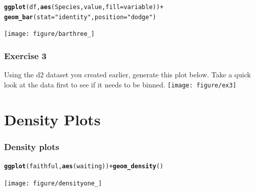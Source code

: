 \documentclass{beamer}\usepackage{graphicx, color}
\makeatletter
\newcommand{\hlfunctioncall}[1]{\textcolor[rgb]{0.501960784313725,0,0.329411764705882}{\textbf{#1}}}%
\newcommand{\hlstring}[1]{\textcolor[rgb]{0.6,0.6,1}{#1}}%
\newenvironment{kframe}{%
 \def\at@end@of@kframe{}%
 \ifinner\ifhmode%
  \def\at@end@of@kframe{\end{minipage}}%
  \begin{minipage}{\columnwidth}%
 \fi\fi%
 \def\FrameCommand##1{\hskip\@totalleftmargin \hskip-\fboxsep
 \colorbox{shadecolor}{##1}\hskip-\fboxsep
     \hskip-\linewidth \hskip-\@totalleftmargin \hskip\columnwidth}%
 \MakeFramed {\advance\hsize-\width
   \@totalleftmargin\z@ \linewidth\hsize
   \@setminipage}}%
 {\par\unskip\endMakeFramed%
 \at@end@of@kframe}
\newenvironment{knitrout}{}{} %
\makeatother
\begin{document}
\begin{frame}[fragile]
\begin{knitrout}\footnotesize
{}\color{fgcolor}\begin{kframe}
\begin{alltt}
\hlfunctioncall{ggplot}(df, \hlfunctioncall{aes}(Species, value, fill = variable)) +
\hlfunctioncall{geom_bar}(stat = \hlstring{"identity"}, position = \hlstring{"dodge"})
\end{alltt}
\end{kframe}
\texttt{[image: figure/barthree\_]} 

\end{knitrout}

\end{frame}

\begin{frame}[fragile]
\frametitle{Exercise 3}
Using the d2 dataset you created earlier, generate this plot below. Take a quick look at the data first to see if it needs to be binned.
\begin{knitrout}\footnotesize
{}\color{fgcolor}
\texttt{[image: figure/ex3]} 

\end{knitrout}

\end{frame}

\section*{Density Plots}
\frame{\sectionpage}

\begin{frame}[fragile]
\frametitle{Density plots}
\begin{knitrout}\footnotesize
{}\color{fgcolor}\begin{kframe}
\begin{alltt}
\hlfunctioncall{ggplot}(faithful, \hlfunctioncall{aes}(waiting)) + \hlfunctioncall{geom_density}()
\end{alltt}
\end{kframe}
\texttt{[image: figure/densityone\_]} 

\end{knitrout}

\end{frame}
\end{document}
